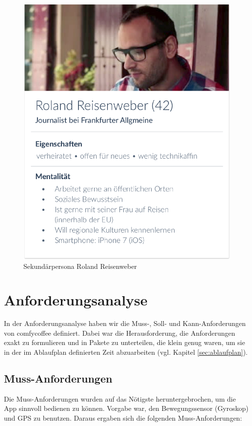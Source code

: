 \begin{figure}[h]
    \centering
		\includegraphics{Bilder/roland.eps}
		\caption{Sekundärpersona Roland Reisenweber}
\end{figure}

\section{Anforderungsanalyse}
In der Anforderungsanalyse haben wir die Muss-, Soll- und Kann-Anforderungen von comfycoffee definiert. Dabei war die Herausforderung, die Anforderungen exakt zu formulieren und in Pakete zu unterteilen, die klein genug waren, um sie in der im Ablaufplan definierten Zeit abzuarbeiten (vgl. Kapitel \ref{sec:ablaufplan}).

\subsection{Muss-Anforderungen}
Die Muss-Anforderungen wurden auf das Nötigste heruntergebrochen, um die App sinnvoll bedienen zu können. Vorgabe war, den Bewegungssensor (Gyroskop) und GPS zu benutzen. Daraus ergaben sich die folgenden Muss-Anforderungen:

